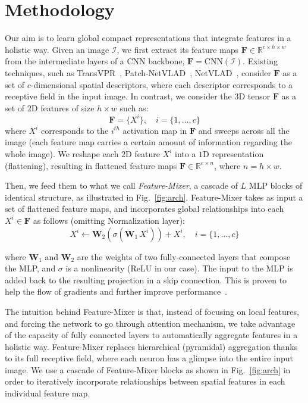\documentclass[10pt,twocolumn,letterpaper]{article}
\begin{document}
\section{Methodology}
\label{sec:metho}
Our aim is to learn global compact representations that integrate features in a holistic way. Given an image $\mathcal{I}$, we first extract its feature maps $\mathbf{F} \in \mathbb{R}^{c\times h\times w}$ from the intermediate layers of a CNN backbone, $\mathbf{F} = \text{CNN}(\mathcal{I})$. Existing techniques, such as TransVPR~\cite{wang2022transvpr}, Patch-NetVLAD~\cite{hausler2021patch}, NetVLAD~\cite{arandjelovic2016netvlad}, consider $\mathbf{F}$ as a set of $c$-dimensional spatial descriptors, where each descriptor corresponds to a receptive field in the input image. 
In contrast, we consider the $3$D tensor $\mathbf{F}$ as a set of $2$D features of size $h {\times} w$ such as:
\begin{equation}
    \mathbf{F} = \{X^i\}, \quad i = \{1, \dots ,c\}
\end{equation}
 where ${X^i}$ corresponds to the $i^{th}$ activation map in $\mathbf{F}$ and sweeps across all the image (each feature map carries a certain amount of information regarding the whole image). We reshape each $2$D feature $X^i$ into a $1$D representation (flattening), resulting in flattened feature maps $\mathbf{F} \in \mathbb{R}^{c \times n}$, where $n=h {\times} w$.

Then, we feed them to what we call \emph{Feature-Mixer}, a cascade of $L$ MLP blocks of identical structure, as illustrated in Fig.~\ref{fig:arch}. Feature-Mixer takes as input a set of flattened feature maps, and incorporates global relationships into each $X^i \in \mathbf{F}$ as follows (omitting Normalization layer):
\begin{equation}
    X^i \leftarrow \mathbf{W}_2  (\sigma ( \mathbf{W}_1 \,  X^i  ) ) + X^i, \quad i=\{1, \dots, c\}
\end{equation}

where $\mathbf{W}_1$ and $\mathbf{W}_2$ are the weights of two fully-connected layers that compose the MLP, and $\sigma$ is a nonlinearity (ReLU in our case). The input to the MLP is added back to the resulting projection in a skip connection. This is proven to help the flow of gradients and further improve performance~\cite{he2016deep}.

The intuition behind Feature-Mixer is that, instead of focusing on local features, and forcing the network  to go through attention mechanism, we take advantage of the capacity of fully connected layers to automatically aggregate features in a holistic way. Feature-Mixer replaces hierarchical (pyramidal) aggregation thanks to its full receptive field, where each neuron has a glimpse into the entire input image. We use a cascade of Feature-Mixer blocks as shown in Fig.~\ref{fig:arch} in order to iteratively incorporate relationships between spatial features in each individual feature map.
\end{document}
